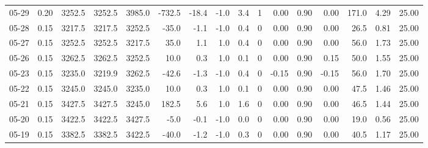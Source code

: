 \begin{threeparttable}
{\begin{tabular}{lrrrrrrrrrrrrrrr}
  05-29 &     0.20 & 3252.5 & 3252.5 & 3985.0 &     -732.5 &          -18.4 &                     -1.0 &                 3.4 &              1 &       0.00 &      0.90 &           0.00 &            171.0 &            4.29 &                  25.00 \\
  05-28 &     0.15 & 3217.5 & 3217.5 & 3252.5 &      -35.0 &           -1.1 &                     -1.0 &                 0.4 &              0 &       0.00 &      0.90 &           0.00 &             26.5 &            0.81 &                  25.00 \\
  05-27 &     0.15 & 3252.5 & 3252.5 & 3217.5 &       35.0 &            1.1 &                      1.0 &                 0.4 &              0 &       0.00 &      0.90 &           0.00 &             56.0 &            1.73 &                  25.00 \\
  05-26 &     0.15 & 3262.5 & 3262.5 & 3252.5 &       10.0 &            0.3 &                      1.0 &                 0.1 &              0 &       0.00 &      0.90 &           0.15 &             50.0 &            1.55 &                  25.00 \\
  05-23 &     0.15 & 3235.0 & 3219.9 & 3262.5 &      -42.6 &           -1.3 &                     -1.0 &                 0.4 &              0 &      -0.15 &      0.90 &          -0.15 &             56.0 &            1.70 &                  25.00 \\
  05-22 &     0.15 & 3245.0 & 3245.0 & 3235.0 &       10.0 &            0.3 &                      1.0 &                 0.1 &              0 &       0.00 &      0.90 &           0.00 &             47.5 &            1.46 &                  25.00 \\
  05-21 &     0.15 & 3427.5 & 3427.5 & 3245.0 &      182.5 &            5.6 &                      1.0 &                 1.6 &              0 &       0.00 &      0.90 &           0.00 &             46.5 &            1.44 &                  25.00 \\
  05-20 &     0.15 & 3422.5 & 3422.5 & 3427.5 &       -5.0 &           -0.1 &                     -1.0 &                 0.0 &              0 &       0.00 &      0.90 &           0.00 &             19.0 &            0.56 &                  25.00 \\
  05-19 &     0.15 & 3382.5 & 3382.5 & 3422.5 &      -40.0 &           -1.2 &                     -1.0 &                 0.3 &              0 &       0.00 &      0.90 &           0.00 &             40.5 &            1.17 &                  25.00 \\

\end{tabular}}
\end{threeparttable}
